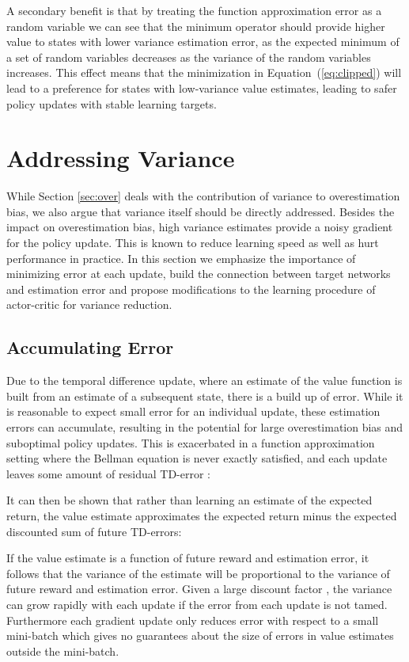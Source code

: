 \documentclass{article}
\begin{document}
A secondary benefit is that by treating the function approximation error as a random variable we can see that the minimum operator should provide higher value to states with lower variance estimation error, as the expected minimum of a set of random variables decreases as the variance of the random variables increases. This effect means that the minimization in Equation~(\ref{eq:clipped}) will lead to a preference for states with low-variance value estimates, leading to safer policy updates with stable learning targets.

\section{Addressing Variance} \label{sec:var}


While Section \ref{sec:over} deals with the contribution of variance to overestimation bias, we also argue that variance itself should be directly addressed. Besides the impact on overestimation bias, high variance estimates provide a noisy gradient for the policy update. This is known to reduce learning speed \citep{sutton1998reinforcement} as well as hurt performance in practice. In this section we emphasize the importance of minimizing error at each update, build the connection between target networks and estimation error and propose modifications to the learning procedure of actor-critic for variance reduction. 

\subsection{Accumulating Error} \label{sec:acerror}


Due to the temporal difference update, where an estimate of the value function is built from an estimate of a subsequent state, there is a build up of error. While it is reasonable to expect small error for an individual update, these estimation errors can accumulate, resulting in the potential for large overestimation bias and suboptimal policy updates. This is exacerbated in a function approximation setting where the Bellman equation is never exactly satisfied, and each update leaves some amount of residual TD-error :
 
It can then be shown that rather than learning an estimate of the expected return, the value estimate approximates the expected return minus the expected discounted sum of future TD-errors:

If the value estimate is a function of future reward and estimation error, it follows that the variance of the estimate will be proportional to the variance of future reward and estimation error. Given a large discount factor , the variance can grow rapidly with each update if the error from each update is not tamed. Furthermore each gradient update only reduces error with respect to a small mini-batch which gives no guarantees about the size of errors in value estimates outside the mini-batch. 
\end{document}
